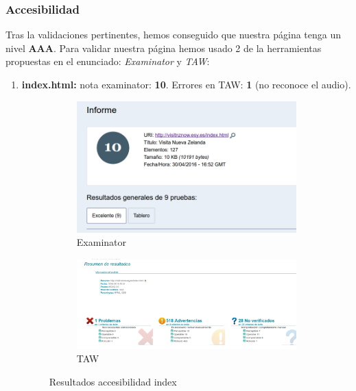 \subsubsection{Accesibilidad}
Tras la validaciones pertinentes, hemos conseguido que nuestra página tenga un nivel \textbf{AAA}. Para validar nuestra página hemos usado 2 de la herramientas propuestas en el enunciado: \textit{Examinator} y \textit{TAW}:
\begin{enumerate}
	\item \textbf{index.html: }nota examinator: \textbf{10}. Errores en TAW: \textbf{1} (no reconoce el audio).
	\begin{figure}
		\centering
		\begin{subfigure}{.5\textwidth}
			\centering
			\includegraphics[width=.8\linewidth]{./Fotos/exa-index.png}
			\caption{Examinator}
			\label{fig: Examinator index}
		\end{subfigure}%
		\begin{subfigure}{.5\textwidth}
			\centering
			\includegraphics[width=.8\linewidth]{./Fotos/taw-index.png}
			\caption{TAW}
			\label{fig: TAW index}
		\end{subfigure}
		\caption{Resultados accesibilidad index}
		\label{fig: Resultados accesibilidad index}
	\end{figure}
	

\end{enumerate}
